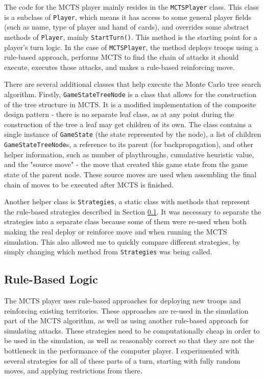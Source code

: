 The code for the MCTS player mainly resides in the \texttt{MCTSPlayer} class. This class is a subclass of \texttt{Player}, which means it has access to some general player fields (such as name, type of player and hand of cards), and overrides some abstract methods of \texttt{Player}, mainly \texttt{StartTurn()}. This method is the starting point for a player's turn logic. In the case of \texttt{MCTSPlayer}, the method deploys troops using a rule-based approach, performs MCTS to find the chain of attacks it should execute, executes those attacks, and makes a rule-based reinforcing move.

There are several additional classes that help execute the Monte Carlo tree search algorithm. Firstly, \texttt{GameStateTreeNode} is a class that allows for the construction of the tree structure in MCTS. It is a modified implementation of the composite design pattern - there is no separate leaf class, as at any point during the construction of the tree a leaf may get children of its own. The class contains a single instance of \texttt{GameState} (the state represented by the node), a list of children \texttt{GameStateTreeNode}s, a reference to its parent (for backpropagation), and other helper information, such as number of playthroughs, cumulative heuristic value, and the "source move" - the move that created this game state from the game state of the parent node. These source moves are used when assembling the final chain of moves to be executed after MCTS is finished.

Another helper class is \texttt{Strategies}, a static class with methods that represent the rule-based strategies described in Section \ref{ruleBasedLogic}. It was necessary to separate the strategies into a separate class because some of them were re-used when both making the real deploy or reinforce move and when running the MCTS simulation. This also allowed me to quickly compare different strategies, by simply changing which method from \texttt{Strategies} was being called.

\subsection{Rule-Based Logic}
\label{ruleBasedLogic}

The MCTS player uses rule-based approaches for deploying new troops and reinforcing existing territories. These approaches are re-used in the simulation part of the MCTS algorithm, as well as using another rule-based approach for simulating attacks. These strategies need to be computationally cheap in order to be used in the simulation, as well as reasonably correct so that they are not the bottleneck in the performance of the computer player. I experimented with several strategies for all of these parts of a turn, starting with fully random moves, and applying restrictions from there.

